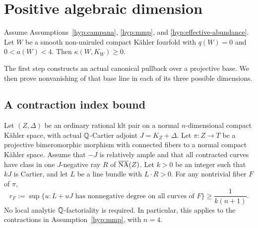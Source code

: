\section{Positive algebraic dimension}
\label{pos:section}

\begin{proposition}\label{pos:nonvanishing}
Assume Assumptions~\ref{hyp:campana}, \ref{hyp:mmp}, and
\ref{hyp:effective-abundance}. Let \(W\) be a smooth non-uniruled
compact Kähler fourfold with \(q(W)=0\) and \(0<a(W)<4\). Then
\(\kappa(W,K_W)\geq0\).
\end{proposition}

The first step constructs an actual canonical pullback over a
projective base. We then prove nonvanishing of that base line in each
of its three possible dimensions.

\subsection{A contraction index bound}

\begin{lemma}\label{pos:rationality}
Let \((Z,\Delta)\) be an ordinary rational klt pair on a normal
\(n\)-dimensional compact Kähler space, with actual \(\mathbb{Q}\)-Cartier
adjoint \(J=K_Z+\Delta\). Let \(\pi:Z\to T\) be a projective
bimeromorphic morphism with connected fibers to a normal compact
Kähler space. Assume that \(-J\) is relatively ample and that all
contracted curves have class in one \(J\)-negative ray \(R\) of
\(\overline{\mathrm{NA}}(Z)\). Let \(k>0\) be an integer such that \(kJ\) is Cartier,
and let \(L\) be a line bundle with \(L\cdot R>0\). For any
nontrivial fiber \(F\) of \(\pi\),
\begin{equation}\label{pos:index-bound}
 r_F:=\sup\{u:L+uJ\text{ has nonnegative degree on all curves of }F\}
 \geq\frac{1}{k(n+1)}.
\end{equation}
No local analytic \(\mathbb{Q}\)-factoriality is required.
In particular, this applies to the contractions in
Assumption~\ref{hyp:mmp}, with \(n=4\).
\end{lemma}

